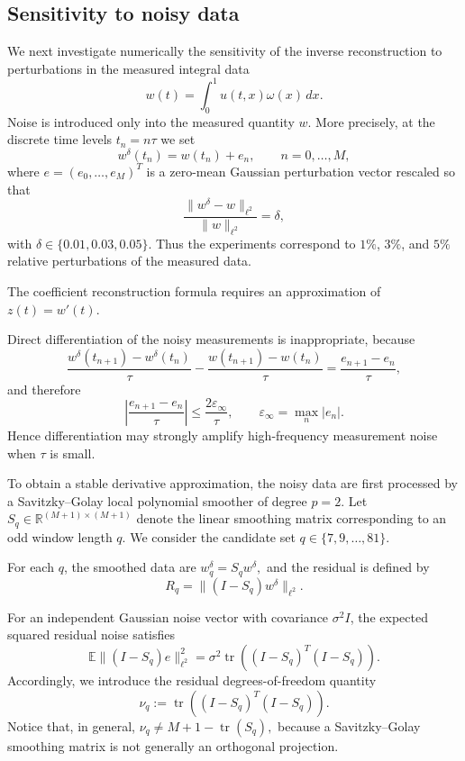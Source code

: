\documentclass[reqno]{amsart}
\begin{document}
\subsection{Sensitivity to noisy data}
\label{subsec:noisy-data}

We next investigate numerically the sensitivity of the inverse
reconstruction to perturbations in the measured integral data
\[
w(t)
=
\int_0^1 u(t,x)\omega(x)\,dx.
\]
Noise is introduced only into the measured quantity \(w\).
More precisely, at the discrete time levels \(t_n=n\tau\) we set
\begin{equation}
w^\delta(t_n)
=
w(t_n)+e_n,
\qquad
n=0,\ldots,M,
\label{eq:noisy-measurements}
\end{equation}
where
$e=(e_0,\ldots,e_M)^T$
is a zero-mean Gaussian perturbation vector rescaled so that
\begin{equation}
\frac{
\|w^\delta-w\|_{\ell^2}
}{
\|w\|_{\ell^2}
}
=
\delta,
\label{eq:relative-noise-level}
\end{equation}
with 
$\delta\in\{0.01,0.03,0.05\}.$
Thus the experiments correspond to \(1\%\), \(3\%\), and \(5\%\)
relative perturbations of the measured data.

The coefficient reconstruction formula requires an approximation of
$z(t)=w'(t).$

Direct differentiation of the noisy measurements is inappropriate,
because
\[
\frac{
w^\delta(t_{n+1})-w^\delta(t_n)
}{\tau}
-
\frac{
w(t_{n+1})-w(t_n)
}{\tau}
=
\frac{e_{n+1}-e_n}{\tau},
\]
and therefore
\[
\left|
\frac{e_{n+1}-e_n}{\tau}
\right|
\le
\frac{2\varepsilon_\infty}{\tau},
\qquad
\varepsilon_\infty
=
\max_n|e_n|.
\]
Hence differentiation may strongly amplify high-frequency
measurement noise when \(\tau\) is small.

To obtain a stable derivative approximation, the noisy data are first
processed by a Savitzky--Golay local polynomial smoother of degree
\(p=2\). Let $S_q\in\mathbb R^{(M+1)\times(M+1)}$
denote the linear smoothing matrix corresponding to an odd window
length \(q\). We consider the candidate set
$q\in\{7,9,\ldots,81\}.$

For each \(q\), the smoothed data are
$w_q^\delta=S_qw^\delta,$
and the residual is defined by
\begin{equation}
R_q
=
\|(I-S_q)w^\delta\|_{\ell^2}.
\label{eq:SG-residual}
\end{equation}

For an independent Gaussian noise vector with covariance
\(\sigma^2I\), the expected squared residual noise satisfies
\[
\mathbb E
\|(I-S_q)e\|_{\ell^2}^2
=
\sigma^2
\operatorname{tr}
\left(
(I-S_q)^T(I-S_q)
\right).
\]
Accordingly, we introduce the residual degrees-of-freedom quantity
\begin{equation}
\nu_q
:=
\operatorname{tr}
\left(
(I-S_q)^T(I-S_q)
\right).
\label{eq:SG-residual-dof}
\end{equation}
Notice that, in general,
$\nu_q
\neq
M+1-\operatorname{tr}(S_q),$
because a Savitzky--Golay smoothing matrix is not generally an
orthogonal projection.
\end{document}
